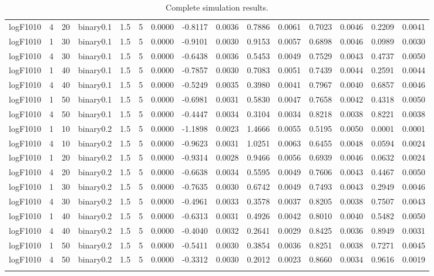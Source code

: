 \begin{longtable}{rrrrrrrrrrrrrrr}
  logF1010 & 4 & 20 & binary0.1 & 1.5 & 5 & 0.0000 & -0.8117 & 0.0036 & 0.7886 & 0.0061 & 0.7023 & 0.0046 & 0.2209 & 0.0041 \\ 
  logF1010 & 1 & 30 & binary0.1 & 1.5 & 5 & 0.0000 & -0.9101 & 0.0030 & 0.9153 & 0.0057 & 0.6898 & 0.0046 & 0.0989 & 0.0030 \\ 
  logF1010 & 4 & 30 & binary0.1 & 1.5 & 5 & 0.0000 & -0.6438 & 0.0036 & 0.5453 & 0.0049 & 0.7529 & 0.0043 & 0.4737 & 0.0050 \\ 
  logF1010 & 1 & 40 & binary0.1 & 1.5 & 5 & 0.0000 & -0.7857 & 0.0030 & 0.7083 & 0.0051 & 0.7439 & 0.0044 & 0.2591 & 0.0044 \\ 
  logF1010 & 4 & 40 & binary0.1 & 1.5 & 5 & 0.0000 & -0.5249 & 0.0035 & 0.3980 & 0.0041 & 0.7967 & 0.0040 & 0.6857 & 0.0046 \\ 
  logF1010 & 1 & 50 & binary0.1 & 1.5 & 5 & 0.0000 & -0.6981 & 0.0031 & 0.5830 & 0.0047 & 0.7658 & 0.0042 & 0.4318 & 0.0050 \\ 
  logF1010 & 4 & 50 & binary0.1 & 1.5 & 5 & 0.0000 & -0.4447 & 0.0034 & 0.3104 & 0.0034 & 0.8218 & 0.0038 & 0.8221 & 0.0038 \\ 
  logF1010 & 1 & 10 & binary0.2 & 1.5 & 5 & 0.0000 & -1.1898 & 0.0023 & 1.4666 & 0.0055 & 0.5195 & 0.0050 & 0.0001 & 0.0001 \\ 
  logF1010 & 4 & 10 & binary0.2 & 1.5 & 5 & 0.0000 & -0.9623 & 0.0031 & 1.0251 & 0.0063 & 0.6455 & 0.0048 & 0.0594 & 0.0024 \\ 
  logF1010 & 1 & 20 & binary0.2 & 1.5 & 5 & 0.0000 & -0.9314 & 0.0028 & 0.9466 & 0.0056 & 0.6939 & 0.0046 & 0.0632 & 0.0024 \\ 
  logF1010 & 4 & 20 & binary0.2 & 1.5 & 5 & 0.0000 & -0.6638 & 0.0034 & 0.5595 & 0.0049 & 0.7606 & 0.0043 & 0.4467 & 0.0050 \\ 
  logF1010 & 1 & 30 & binary0.2 & 1.5 & 5 & 0.0000 & -0.7635 & 0.0030 & 0.6742 & 0.0049 & 0.7493 & 0.0043 & 0.2949 & 0.0046 \\ 
  logF1010 & 4 & 30 & binary0.2 & 1.5 & 5 & 0.0000 & -0.4961 & 0.0033 & 0.3578 & 0.0037 & 0.8205 & 0.0038 & 0.7507 & 0.0043 \\ 
  logF1010 & 1 & 40 & binary0.2 & 1.5 & 5 & 0.0000 & -0.6313 & 0.0031 & 0.4926 & 0.0042 & 0.8010 & 0.0040 & 0.5482 & 0.0050 \\ 
  logF1010 & 4 & 40 & binary0.2 & 1.5 & 5 & 0.0000 & -0.4040 & 0.0032 & 0.2641 & 0.0029 & 0.8425 & 0.0036 & 0.8949 & 0.0031 \\ 
  logF1010 & 1 & 50 & binary0.2 & 1.5 & 5 & 0.0000 & -0.5411 & 0.0030 & 0.3854 & 0.0036 & 0.8251 & 0.0038 & 0.7271 & 0.0045 \\ 
  logF1010 & 4 & 50 & binary0.2 & 1.5 & 5 & 0.0000 & -0.3312 & 0.0030 & 0.2012 & 0.0023 & 0.8660 & 0.0034 & 0.9616 & 0.0019 \\ 
   \bottomrule
\caption{Complete simulation results.} 
\label{tab:complete-results}
\end{longtable}
\endgroup
